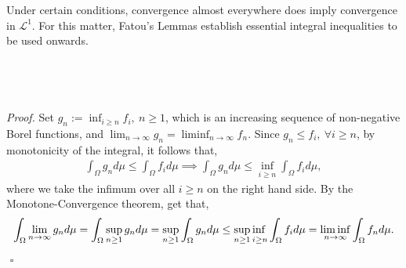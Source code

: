 \documentclass{article}
\begin{document}
Under certain conditions, convergence almost everywhere does imply convergence in $\mathcal{L}^1$. For this matter, Fatou's Lemmas establish essential integral inequalities to be used onwards.\\\\
\noindent{}\\\\\\
\textit{Proof.} Set $g_n := \inf_{i \geq n}f_i, \ n \geq 1$, which is an increasing sequence of non-negative Borel functions, and $\lim_{n\to\infty}g_n = \liminf_{n\to\infty}f_n$. Since $g_n \leq f_i, \ \forall i \geq n$, by monotonicity of the integral, it follows that,
\begin{eqnarray}
\nonumber
\int_\Omega g_n d\mu \leq \int_\Omega f_i d\mu \implies \int_\Omega g_n d\mu \leq \inf_{i \geq n}\int_\Omega f_i d\mu,
\end{eqnarray}
where we take the infimum over all $i \geq n$ on the right hand side. By the Monotone-Convergence theorem, get that,
\begin{eqnarray}
\nonumber
\int_\Omega \lim_{n\to\infty}g_n d\mu = \int_{\Omega} \sup_{n \geq 1}g_n d\mu = \sup_{n \geq 1}\int_\Omega g_n d\mu \leq \adjustlimits{\sup}_{n \geq 1}{\inf}_{i \geq n}\int_\Omega f_i d\mu = \liminf_{n\to\infty}\int_\Omega f_n d\mu. 
\end{eqnarray}
${}$ \hfill $\square$\\\\
\noindent{}\\\\\\
\end{document}

